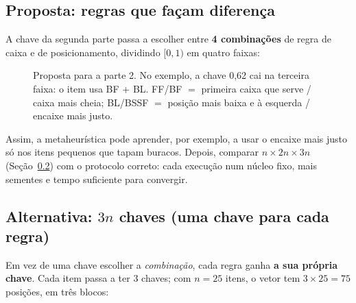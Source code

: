 \documentclass[11pt,a4paper]{article}
\begin{document}
\subsection{Proposta: regras que façam diferença}
A chave da segunda parte passa a escolher entre \textbf{4 combinações} de regra de caixa e de posicionamento,
dividindo $[0,1)$ em quatro faixas:

\begin{figure}[H]
\centering
{}
\caption{Proposta para a parte 2. No exemplo, a chave 0,62 cai na terceira faixa: o item usa BF + BL.
FF/BF $=$ primeira caixa que serve / caixa mais cheia; BL/BSSF $=$ posição mais baixa e à esquerda / encaixe mais justo.}
\end{figure}

Assim, a metaheurística pode aprender, por exemplo, a usar o encaixe mais justo só nos itens pequenos que tapam
buracos. Depois, comparar $n\times2n\times3n$ (Seção~\ref{sec:3n}) com o protocolo correto: cada execução num
núcleo fixo, mais sementes e tempo suficiente para convergir.

\subsection{Alternativa: $3n$ chaves (uma chave para cada regra)}\label{sec:3n}
Em vez de uma chave escolher a \emph{combinação}, cada regra ganha \textbf{a sua própria chave}. Cada item passa a ter
3 chaves; com $n=25$ itens, o vetor tem $3\times25=75$ posições, em três blocos:
\end{document}

